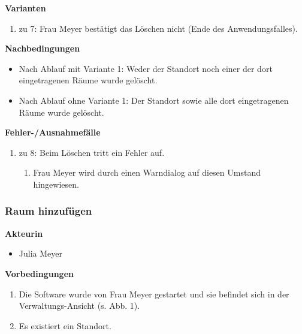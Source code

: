\documentclass[fontsize=12pt,paper=a4,twoside]{scrartcl}
\begin{document}
\textbf{Varianten}
\begin{enumerate}
\item zu 7: Frau Meyer bestätigt das Löschen nicht (Ende des Anwendungsfalles).
\end{enumerate}
\vspace{5pt}

\textbf{Nachbedingungen}
\begin{itemize}
\item Nach Ablauf mit Variante 1: Weder der Standort noch einer der dort eingetragenen Räume wurde gelöscht.
\item Nach Ablauf ohne Variante 1: Der Standort sowie alle dort eingetragenen Räume wurde gelöscht.
\end{itemize}
\vspace{5pt}

\textbf{Fehler-/Ausnahmefälle}
\begin{enumerate}
\item zu 8: Beim Löschen tritt ein Fehler auf.
	\begin{enumerate}[label=\arabic*.]
	\item Frau Meyer wird durch einen Warndialog auf diesen Umstand hingewiesen.
	\end{enumerate}
\end{enumerate}

\subsubsection{Raum hinzufügen}
\textbf{Akteurin}
\begin{itemize}
\item Julia Meyer
\end{itemize}
\vspace{5pt}

\textbf{Vorbedingungen}
\begin{enumerate}
\item Die Software wurde von Frau Meyer gestartet und sie befindet sich in der Verwaltungs-Ansicht (s. Abb. 1).
\item Es existiert ein Standort.
\end{enumerate}
\vspace{5pt}
\end{document}
